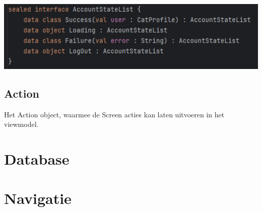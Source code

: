 \documentclass{report}
\begin{document}
\begin{center}
    \includegraphics{VM_State}
\end{center}



\subsection{Action}

Het Action object, waarmee de Screen acties kan laten uitvoeren in het viewmodel.




\section{Database}

\section{Navigatie}
\end{document}
